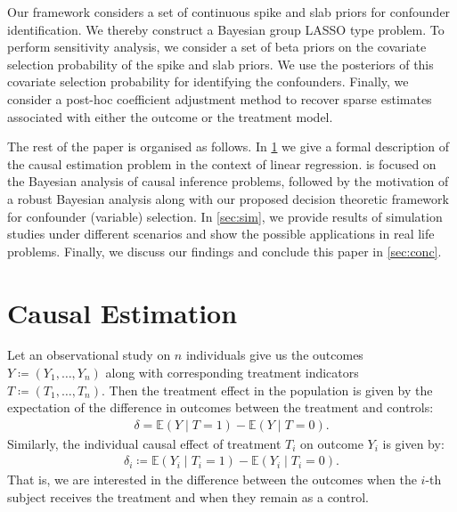 \documentclass{amsart}
\begin{document}
Our framework considers a set of continuous spike and slab priors 
\cite{ishwaran2005} for confounder identification.
We thereby construct a Bayesian group LASSO \cite{xu2015} type problem.
To perform sensitivity analysis,
we consider a set of beta priors on the covariate selection 
probability of the spike and slab priors. We use the posteriors of this
covariate selection probability for identifying the confounders. Finally, 
we consider a post-hoc coefficient adjustment method \cite{hahn2015}
to recover sparse estimates associated with either the outcome or the
treatment model. 

The rest of the paper is organised as follows. In \cref{sec:causal}
we give a formal description of the causal estimation problem in the
context of linear regression.  is focused on the
Bayesian analysis of causal inference problems, followed by the
motivation of a robust Bayesian analysis along with our proposed decision 
theoretic framework for confounder (variable) selection. In \cref{sec:sim}, 
we provide results of simulation studies under different scenarios 
and show the possible applications in real life problems. Finally, 
we discuss our findings and conclude this paper in \cref{sec:conc}.

\section{Causal Estimation}\label{sec:causal}


Let an observational study on $n$ individuals give us the outcomes $Y\coloneqq(Y_1, \dots, Y_n)$ along with 
corresponding treatment indicators $T\coloneqq(T_1, \dots, T_n)$. Then the
treatment 
effect in the population is given by the expectation of the difference
in outcomes between the treatment and controls:
\begin{align}
	\delta = \mathbb{E}(Y\mid T =1) - \mathbb{E}(Y\mid T=0).
\end{align}
Similarly, the individual causal
effect of treatment $T_i$ on outcome $Y_i$ is given by:
\begin{align}
	\delta_i \coloneqq \mathbb{E}(Y_i\mid T_i=1) - \mathbb{E}(Y_i\mid T_i=0).
\end{align}
That is, we are interested in the difference between the outcomes when the $i$-th subject receives
the treatment and when they remain as a control. 
\end{document}
